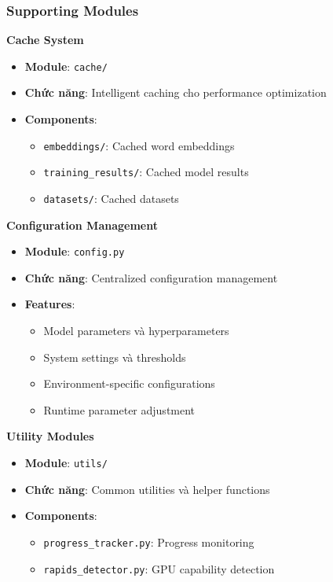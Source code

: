 \subsubsection{Supporting Modules}

\textbf{Cache System}
\begin{itemize}
    \item \textbf{Module}: \texttt{cache/}
    \item \textbf{Chức năng}: Intelligent caching cho performance optimization
    \item \textbf{Components}:
        \begin{itemize}
            \item \texttt{embeddings/}: Cached word embeddings
            \item \texttt{training\_results/}: Cached model results
            \item \texttt{datasets/}: Cached datasets
        \end{itemize}
\end{itemize}

\textbf{Configuration Management}
\begin{itemize}
    \item \textbf{Module}: \texttt{config.py}
    \item \textbf{Chức năng}: Centralized configuration management
    \item \textbf{Features}:
        \begin{itemize}
            \item Model parameters và hyperparameters
            \item System settings và thresholds
            \item Environment-specific configurations
            \item Runtime parameter adjustment
        \end{itemize}
\end{itemize}

\textbf{Utility Modules}
\begin{itemize}
    \item \textbf{Module}: \texttt{utils/}
    \item \textbf{Chức năng}: Common utilities và helper functions
    \item \textbf{Components}:
        \begin{itemize}
            \item \texttt{progress\_tracker.py}: Progress monitoring
            \item \texttt{rapids\_detector.py}: GPU capability detection
        \end{itemize}
\end{itemize}

